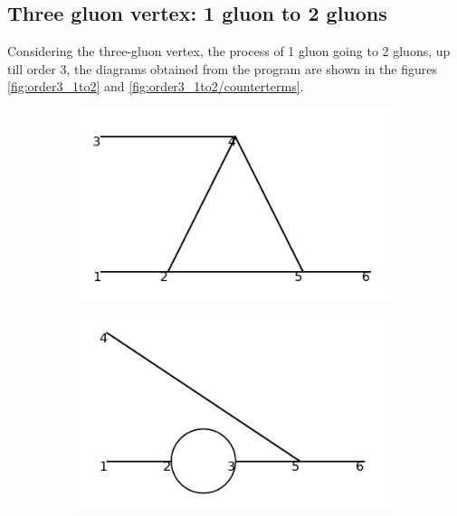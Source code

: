 \documentclass[11pt,a4paper,twoside,pdf]{article}
\numberwithin{equation}{section}
\begin{document}
\subsection{Three gluon vertex: 1 gluon to 2 gluons}

Considering the three-gluon vertex, the process of 1 gluon going to 2 gluons, up till 
order 3, the diagrams obtained from the program are shown in the figures 
\ref{fig:order3_1to2} and \ref{fig:order3_1to2/counterterms}.

\begin{figure}[h!]
    \centering
    \begin{subfigure}[t]{0.24\textwidth}
        \centering
        \includegraphics[width=\textwidth]{plots/order3/order3_1to2/1.png}
        \caption{ }
    \end{subfigure}%
    \hfill
    \begin{subfigure}[t]{0.24\textwidth}
        \centering
        \includegraphics[width=\textwidth]{plots/order3/order3_1to2/2.png}
        \caption{ }

\end{subfigure}
\end{figure}
\end{document}
